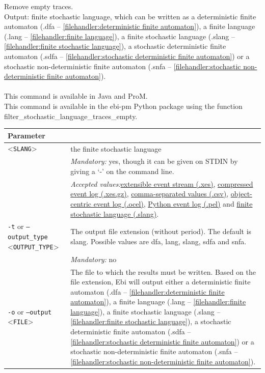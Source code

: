 {\label{command:Ebi filter stochastic-language traces empty}
Remove empty traces.\\
\noindent Output: finite stochastic language, which can be written as a deterministic finite automaton (.dfa -- \cref{filehandler:deterministic finite automaton}), a finite language (.lang -- \cref{filehandler:finite language}), a finite stochastic language (.slang -- \cref{filehandler:finite stochastic language}), a stochastic deterministic finite automaton (.sdfa -- \cref{filehandler:stochastic deterministic finite automaton}) or a stochastic non-deterministic finite automaton (.snfa -- \cref{filehandler:stochastic non-deterministic finite automaton}).\\
\\This command is available in Java and ProM.
\\This command is available in the ebi-pm Python package using the function filter\_stochastic\_language\_traces\_empty.
\begin{tabularx}{\linewidth}{lX}
\toprule
Parameter \\\midrule
<\texttt{SLANG}>&the finite stochastic language\\
&\textit{Mandatory:} \quad yes, though it can be given on STDIN by giving a `-' on the command line.\\
&\textit{Accepted values:}\quad \hyperref[filehandler:extensible event stream]{extensible event stream (.xes)}, \hyperref[filehandler:compressed event log]{compressed event log (.xes.gz)}, \hyperref[filehandler:comma-separated values]{comma-separated values (.csv)}, \hyperref[filehandler:object-centric event log]{object-centric event log (.ocel)}, \hyperref[filehandler:Python event log]{Python event log (.pel)} and \hyperref[filehandler:finite stochastic language]{finite stochastic language (.slang)}.\\
\texttt{-t} or \texttt{--output\_type} <\texttt{OUTPUT\_TYPE}> &
The output file extension (without period). The default is slang. Possible values are dfa, lang, slang, sdfa and snfa.\\
&\textit{Mandatory:} \quad no\\
\texttt{-o} or \texttt{--output} <\texttt{FILE}> &
The file to which the results must be written. Based on the file extension, Ebi will output either a deterministic finite automaton (.dfa -- \cref{filehandler:deterministic finite automaton}), a finite language (.lang -- \cref{filehandler:finite language}), a finite stochastic language (.slang -- \cref{filehandler:finite stochastic language}), a stochastic deterministic finite automaton (.sdfa -- \cref{filehandler:stochastic deterministic finite automaton}) or a stochastic non-deterministic finite automaton (.snfa -- \cref{filehandler:stochastic non-deterministic finite automaton}).

\end{tabularx}}
